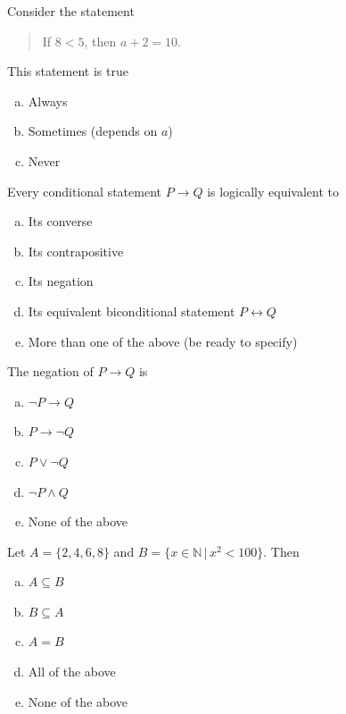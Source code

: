 \documentclass[palatino]{beamer}
\begin{document}
\begin{frame}
	Consider the statement
	\begin{quote}
		If $8 < 5$, then $a + 2 = 10$. 
	\end{quote}
This statement is true
\begin{enumerate}[(a)]
	\item Always
	\item Sometimes (depends on $a$)
	\item Never
\end{enumerate}
\end{frame}

\begin{frame}
	Every conditional statement $P \rightarrow Q$ is logically equivalent to
	\begin{enumerate}[(a)]
		\item Its converse
		\item Its contrapositive
		\item Its negation
		\item Its equivalent biconditional statement $P \leftrightarrow Q$
		\item More than one of the above (be ready to specify)
	\end{enumerate}
\end{frame}

\begin{frame}
	The negation of $P \rightarrow Q$ is 
	\begin{enumerate}[(a)]
		\item $\neg P \rightarrow Q$
		\item $P \rightarrow \neg Q$
		\item $P \vee \neg Q$
		\item $\neg P \wedge Q$
		\item None of the above
	\end{enumerate}
\end{frame}


\begin{frame}
	Let $A = \{ 2, 4, 6, 8\}$ and $B = \{ x \in \mathbb{N} \, | \, x^2 < 100 \}$. Then
	\begin{enumerate}[(a)]
		\item $A \subseteq B$
		\item $B \subseteq A$
		\item $A = B$
		\item All of the above
		\item None of the above
	\end{enumerate}
\end{frame}
\end{document}
